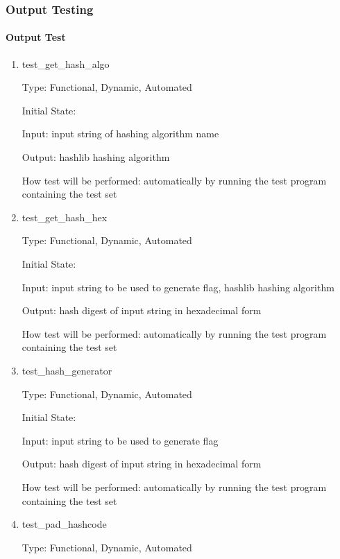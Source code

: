 \documentclass[12pt, titlepage]{article}
\begin{document}
\subsubsection{Output Testing}
		
\paragraph{Output Test}

\begin{enumerate}

\item{test\_get\_hash\_algo\\}

Type: Functional, Dynamic, Automated

Initial State:

Input: input string of hashing algorithm name

Output: hashlib hashing algorithm

How test will be performed: automatically by running the test program
containing the test set

\item{test\_get\_hash\_hex\\}

Type: Functional, Dynamic, Automated

Initial State:

Input: input string to be used to generate flag, hashlib hashing algorithm

Output: hash digest of input string in hexadecimal form

How test will be performed: automatically by running the test program
containing the test set

\item{test\_hash\_generator\\}

Type: Functional, Dynamic, Automated

Initial State:

Input: input string to be used to generate flag

Output: hash digest of input string in hexadecimal form

How test will be performed: automatically by running the test program
containing the test set

\item{test\_pad\_hashcode\\}

Type: Functional, Dynamic, Automated


\end{enumerate}
\end{document}
